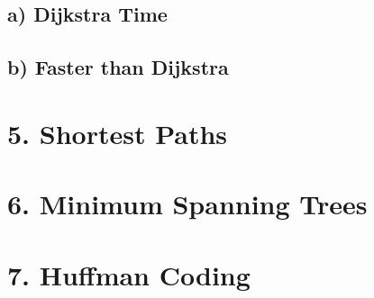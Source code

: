 \documentclass{article}
\begin{document}
\subsection*{a) Dijkstra Time}
\subsection*{b) Faster than Dijkstra}

\section*{5. Shortest Paths}

\section*{6. Minimum Spanning Trees}

\section*{7. Huffman Coding}
\end{document}
